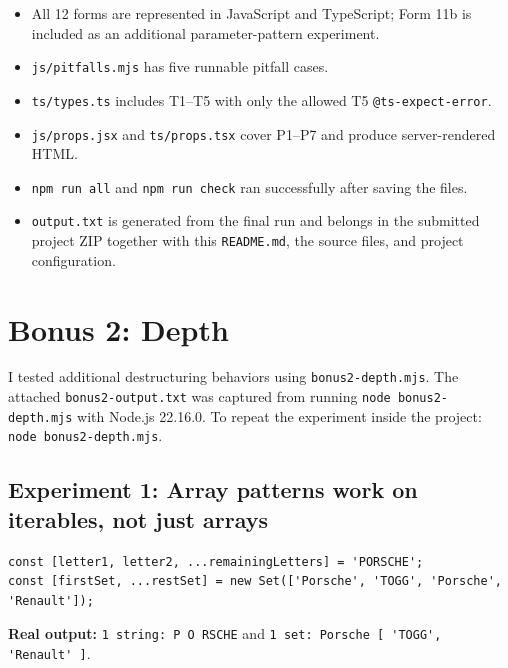 \documentclass[
  9pt,
]{article}
\newcommand{\passthrough}[1]{#1}
\providecommand{\tightlist}{%
  \setlength{\itemsep}{0pt}\setlength{\parskip}{0pt}}
\begin{document}
\begin{itemize}
\tightlist
\item
  All 12 forms are represented in JavaScript and TypeScript; Form 11b is
  included as an additional parameter-pattern experiment.
\item
  \passthrough{\lstinline!js/pitfalls.mjs!} has five runnable pitfall
  cases.
\item
  \passthrough{\lstinline!ts/types.ts!} includes T1--T5 with only the
  allowed T5 \passthrough{\lstinline!@ts-expect-error!}.
\item
  \passthrough{\lstinline!js/props.jsx!} and
  \passthrough{\lstinline!ts/props.tsx!} cover P1--P7 and produce
  server-rendered HTML.
\item
  \passthrough{\lstinline!npm run all!} and
  \passthrough{\lstinline!npm run check!} ran successfully after saving
  the files.
\item
  \passthrough{\lstinline!output.txt!} is generated from the final run
  and belongs in the submitted project ZIP together with this
  \passthrough{\lstinline!README.md!}, the source files, and project
  configuration.
\end{itemize}

\section{Bonus 2: Depth}\label{bonus-2-depth}

I tested additional destructuring behaviors using
\passthrough{\lstinline!bonus2-depth.mjs!}. The attached
\passthrough{\lstinline!bonus2-output.txt!} was captured from running
\passthrough{\lstinline!node bonus2-depth.mjs!} with Node.js 22.16.0. To
repeat the experiment inside the project:
\passthrough{\lstinline!node bonus2-depth.mjs!}.

\subsection{Experiment 1: Array patterns work on iterables, not just
arrays}\label{experiment-1-array-patterns-work-on-iterables-not-just-arrays}

\begin{lstlisting}
const [letter1, letter2, ...remainingLetters] = 'PORSCHE';
const [firstSet, ...restSet] = new Set(['Porsche', 'TOGG', 'Porsche', 'Renault']);
\end{lstlisting}

\textbf{Real output:} \passthrough{\lstinline!1 string: P O RSCHE!} and
\passthrough{\lstinline!1 set: Porsche [ 'TOGG', 'Renault' ]!}.
\end{document}
